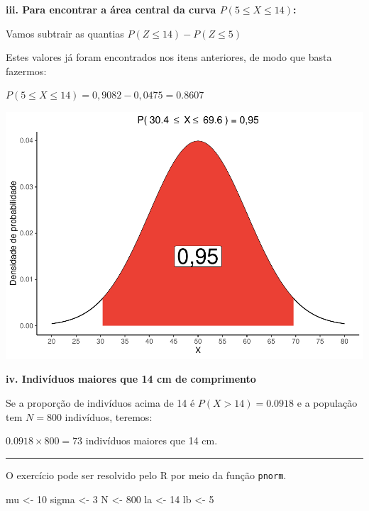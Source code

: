 \documentclass[
]{book}
\newenvironment{Shaded}{\begin{snugshade}}{\end{snugshade}}
\newcommand{\DecValTok}[1]{\textcolor[rgb]{0.00,0.00,0.81}{#1}}
\newcommand{\NormalTok}[1]{#1}
\newcommand{\OtherTok}[1]{\textcolor[rgb]{0.56,0.35,0.01}{#1}}
\begin{document}
\textbf{iii. Para encontrar a área central da curva \(P(5 \le X \le 14)\):}

Vamos subtrair as quantias \(P(Z \le 14) - P(Z \le 5)\)

Estes valores já foram encontrados nos itens anteriores, de modo que basta fazermos:

\(P(5 \le X \le 14) = 0,9082 - 0,0475 = 0.8607\)

\includegraphics{probest-cambientais_files/figure-latex/unnamed-chunk-88-1.pdf}

\textbf{iv. Indivíduos maiores que 14 cm de comprimento}

Se a proporção de indivíduos acima de 14 é \(P(X > 14) = 0.0918\) e a população tem \(N = 800\) indivíduos, teremos:

\(0.0918 \times 800 = 73\) indivíduos maiores que 14 cm.

\begin{center}\rule{0.5\linewidth}{0.5pt}\end{center}

O exercício pode ser resolvido pelo R por meio da função \texttt{pnorm}.

\begin{Shaded}
\begin{Highlighting}[]
\NormalTok{mu }\OtherTok{\textless{}{-}} \DecValTok{10}
\NormalTok{sigma }\OtherTok{\textless{}{-}} \DecValTok{3}
\NormalTok{N }\OtherTok{\textless{}{-}} \DecValTok{800}
\NormalTok{la }\OtherTok{\textless{}{-}} \DecValTok{14}
\NormalTok{lb }\OtherTok{\textless{}{-}} \DecValTok{5}
\end{Highlighting}
\end{Shaded}
\end{document}
